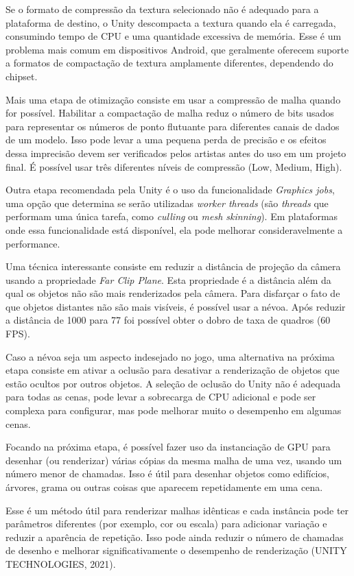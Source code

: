 Se o formato de compressão da textura selecionado não é adequado para a plataforma de destino, o Unity descompacta a textura quando ela é carregada, consumindo tempo de CPU e uma quantidade excessiva de memória. Esse é um problema mais comum em dispositivos Android, que geralmente oferecem suporte a formatos de compactação de textura amplamente diferentes, dependendo do chipset.

Mais uma etapa de otimização consiste em usar a compressão de malha quando for possível.  Habilitar a compactação de malha reduz o número de bits usados para representar os números de ponto flutuante para diferentes canais de dados de um modelo. Isso pode levar a uma pequena perda de precisão e os efeitos dessa imprecisão devem ser verificados pelos artistas antes do uso em um projeto final. É possível usar três diferentes níveis de compressão (Low, Medium, High).

Outra etapa recomendada pela Unity é o uso da funcionalidade \textit{Graphics jobs}, uma opção que determina se serão utilizadas \textit{worker threads} (são \textit{threads} que performam uma única tarefa, como \textit{culling} ou \textit{mesh skinning}). Em plataformas onde essa funcionalidade está disponível, ela pode melhorar consideravelmente a performance.

Uma técnica interessante consiste em reduzir a distância de projeção da câmera usando a propriedade \textit{Far Clip Plane}. Esta propriedade é a distância além da qual os objetos não são mais renderizados pela câmera. Para disfarçar o fato de que objetos distantes não são mais visíveis, é possível usar a névoa. Após reduzir a distância de 1000 para 77 foi possível obter o dobro de taxa de quadros (60 FPS).

Caso a névoa seja um aspecto indesejado no jogo, uma alternativa na próxima etapa consiste em ativar a oclusão para desativar a renderização de objetos que estão ocultos por outros objetos. A seleção de oclusão do Unity não é adequada para todas as cenas, pode levar a sobrecarga de CPU adicional e pode ser complexa para configurar, mas pode melhorar muito o desempenho em algumas cenas.

Focando na próxima etapa, é possível fazer uso da instanciação de GPU para desenhar (ou renderizar) várias cópias da mesma malha de uma vez, usando um número menor de chamadas. Isso é útil para desenhar objetos como edifícios, árvores, grama ou outras coisas que aparecem repetidamente em uma cena.

Esse é um método útil para renderizar malhas idênticas e cada instância pode ter parâmetros diferentes (por exemplo, cor ou escala) para adicionar variação e reduzir a aparência de repetição. Isso pode ainda reduzir o número de chamadas de desenho e melhorar significativamente o desempenho de renderização (UNITY TECHNOLOGIES, 2021)\nocite{unity2Tech2021}.

